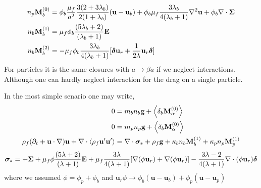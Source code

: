 \documentclass[12pt]{My_preprint}
\begin{document}
\begin{align}
    n_p \textbf{M}_b^{(0)}
    &=
    \phi_b
    \frac{\mu_f}{a^2}
    \frac{3(2+3\lambda_b)}{2(1+\lambda_b)}(\textbf{u} - \textbf{u}_b)
    + \phi_b\mu_f  \frac{3\lambda_b}{4(\lambda_b +1)} \grad^2 \textbf{u}
    + \phi_b \div\bm\Sigma
    \\
    n_b \textbf{M}_b^{(1)}
    &= \mu_f \phi_b 
    \frac{(5\lambda_b +2)}{(\lambda_b +1)}\textbf{E} 
    \\
    n_b \textbf{M}_b^{(2)} 
    &=
    - \mu_f \phi_b \frac{3\lambda_b}{4(\lambda_b +1)}[\bm\delta \textbf{u}_r + \frac{1}{2\lambda}\textbf{u}_r \bm\delta ]
\end{align}
For particles it is the same closures with $a \to \beta a$ if we neglect interactions. 
Although one can hardly neglect interaction for the drag on a single particle. 

In the most simple senario one may write,
\begin{align}
    0
    &= 
    m_b n_b \textbf{g}
    + \pavg[b]{\textbf{M}^{(0)}_\alpha}
    \\
    0
    &= 
    m_p n_p \textbf{g}
    + \pavg[b]{\textbf{M}^{(0)}_\alpha}
    \\
    \rho_f (\pddt + \textbf{u} \cdot \grad)\textbf{u}
    + \div \avg{\rho_f \textbf{u}' \textbf{u}'}
    &= 
    \div \bm\sigma_*
    + \rho_f \textbf{g}
    +\kappa_b   n_b \textbf{M}_b^{(1)}
    +\kappa_p   n_p \textbf{M}_p^{(1)}
\end{align}
\begin{align*}
    \bm\sigma_*  = 
    + \bm\Sigma
    + \mu_f \phi  \frac{(5\lambda +2)}{(\lambda +1)}\textbf{E} 
    + \mu_f \frac{3\lambda}{4(\lambda +1)}[\grad (\phi \textbf{u}_r)+\grad (\phi\textbf{u}_r)] 
    - \frac{3\lambda-2}{4(\lambda+1)}\div (\phi\textbf{u}_r) \bm\delta 
\end{align*}
where we assumed $\phi = \phi_p + \phi_b$ and $\textbf{u}_r\phi \to \phi_b(\textbf{u}-\textbf{u}_b ) + \phi_p (\textbf{u}- \textbf{u}_p)$
\end{document}
